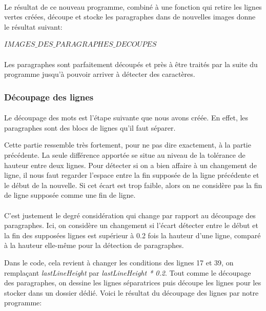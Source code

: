 \documentclass{article}
\begin{document}
	\paragraph{}
	Le résultat de ce nouveau programme, combiné à une fonction qui retire les lignes vertes créées, découpe et stocke les paragraphes dans de nouvelles images donne le résultat suivant: 
	
	$IMAGES\_DES\_PARAGRAPHES\_DECOUPES$
	
	\paragraph{}
	Les paragraphes sont parfaitement découpés et près à être traités par la suite du programme jusqu'à pouvoir arriver à détecter des caractères.
	
	\subsubsection{Découpage des lignes}
	\paragraph{}
	Le découpage des mots est l'étape suivante que nous avons créée. En effet, les paragraphes sont des blocs de lignes qu'il faut séparer.
	\par Cette partie ressemble très fortement, pour ne pas dire exactement, à la partie précédente. La seule différence apportée se situe au niveau de la tolérance de hauteur entre deux lignes. Pour détecter si on a bien affaire à un changement de ligne, il nous faut regarder l'espace entre la fin supposée de la ligne précédente et le début de la nouvelle. Si cet écart est trop faible, alors on ne considère pas la fin de ligne supposée comme une fin de ligne.
	
	\paragraph{}
	C'est justement le degré considération qui change par rapport au découpage des paragraphes. Ici, on considère un changement si l'écart détecter entre le début et la fin des supposées lignes est supérieur à 0.2 fois la hauteur d'une ligne, comparé à la hauteur elle-même pour la détection de paragraphes.
	\par Dans le code, cela revient à changer les conditions des lignes 17 et 39, on remplaçant \textit{lastLineHeight} par \textit{lastLineHeight * 0.2}. Tout comme le découpage des paragraphes, on dessine les lignes séparatrices puis découpe les lignes pour les stocker dans un dossier dédié. Voici le résultat du découpage des lignes par notre programme: \\
	
\end{document}
